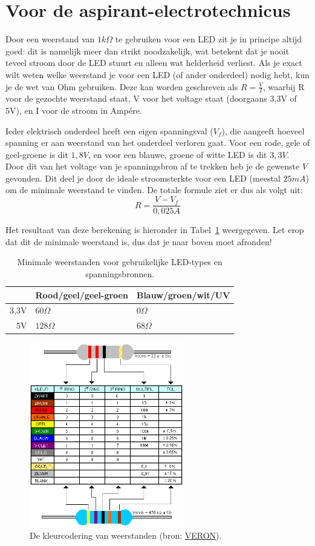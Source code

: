 \documentclass{guide}
\begin{document}
\section{Voor de aspirant-electrotechnicus}
Door een weerstand van $1 k\Omega$ te gebruiken voor een LED zit je in principe altijd goed: dit is namelijk meer dan strikt noodzakelijk, wat betekent dat je nooit teveel stroom door de LED stuurt en alleen wat helderheid verliest. Als je exact wilt weten welke weerstand je voor een LED (of ander onderdeel) nodig hebt, kun je de wet van Ohm gebruiken. Deze kan worden geschreven als $R = \frac{V}{I}$, waarbij R voor de gezochte weerstand staat, V voor het voltage staat (doorgaans 3,3V of 5V), en I voor de stroom in Amp\'{e}re.

Ieder elektrisch onderdeel heeft een eigen spanningsval ($V_f$), die aangeeft hoeveel spanning er aan weerstand van het onderdeel verloren gaat. Voor een rode, gele of geel-groene is dit $1,8V$, en voor een blauwe, groene of witte LED is dit $3,3V$. Door dit van het voltage van je spanningsbron af te trekken heb je de gewenste $V$ gevonden. Dit deel je door de ideale stroomsterkte voor een LED (meestal $25 mA$) om de minimale weerstand te vinden. De totale formule ziet er dus als volgt uit: $$R = \frac{V-V_f}{0,025A}$$

Het resultaat van deze berekening is hieronder in Tabel~\ref{tab:resistors} weergegeven. Let erop dat dit de minimale weerstand is, dus dat je naar boven moet afronden!
\begin{table}[h]
  \centering
  \begin{tabular}{|r|l|l|}
    \hline
    & Rood/geel/geel-groen & Blauw/groen/wit/UV \\
    \hline
    3,3V & $60 \Omega$ & $0 \Omega$ \\
    \hline
    5V & $128 \Omega$ & $68 \Omega$ \\
    \hline
  \end{tabular}
  \caption{Minimale weerstanden voor gebruikelijke LED-types en spanningsbronnen.}\label{tab:resistors}
\end{table}

\begin{figure}[p]
  \centering
  \includegraphics[width=0.6\textwidth]{images/resistors.png}
  \caption{De kleurcodering van weerstanden (bron: \href{https://a29.veron.nl/wp-content/uploads/2015/09/weerstandscodes.gif}{VERON}).} \label{fig:resistor}
\end{figure}
\end{document}
